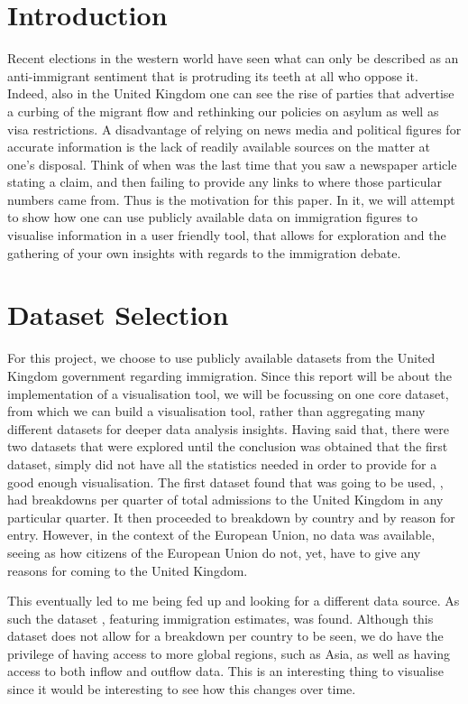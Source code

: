 \documentclass[11pt,a4paper,titlepage]{article}
\begin{document}
\setcounter{page}{1}

\section{Introduction}
Recent elections in the western world have seen what can only be described as an anti-immigrant sentiment that is protruding its teeth at all who oppose it. Indeed, also in the United Kingdom one can see the rise of parties that advertise a curbing of the migrant flow and rethinking our policies on asylum as well as visa restrictions. A disadvantage of relying on news media and political figures for accurate information is the lack of readily available sources on the matter at one's disposal. Think of when was the last time that you saw a newspaper article stating a claim, and then failing to provide any links to where those particular numbers came from. Thus is the motivation for this paper. In it, we will attempt to show how one can use publicly available data on immigration figures to visualise information in a user friendly tool, that allows for exploration and the gathering of your own insights with regards to the immigration debate.

\section{Dataset Selection}
For this project, we choose to use publicly available datasets from the United Kingdom government regarding immigration. Since this report will be about the implementation of a visualisation tool, we will be focussing on one core dataset, from which we can build a visualisation tool, rather than aggregating many different datasets for deeper data analysis insights. Having said that, there were two datasets that were explored until the conclusion was obtained that the first dataset, simply did not have all the statistics needed in order to provide for a good enough visualisation. The first dataset found that was going to be used, \cite{data_gov}, had breakdowns per quarter of total admissions to the United Kingdom in any particular quarter. It then proceeded to breakdown by country and by reason for entry. However, in the context of the European Union, no data was available, seeing as how citizens of the European Union do not, yet, have to give any reasons for coming to the United Kingdom.

This eventually led to me being fed up and looking for a different data source. As such the dataset \cite{ons_estimates}, featuring immigration estimates, was found. Although this dataset does not allow for a breakdown per country to be seen, we do have the privilege of having access to more global regions, such as Asia, as well as having access to both inflow and outflow data. This is an interesting thing to visualise since it would be interesting to see how this changes over time.
\end{document}
